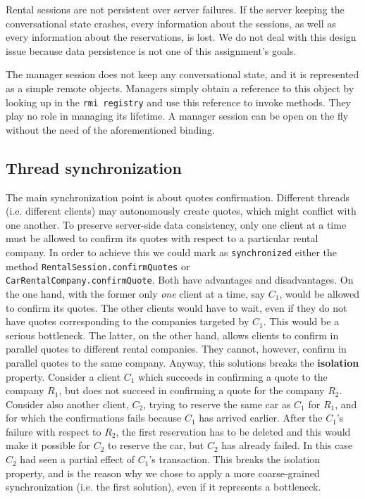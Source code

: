 Rental sessions are not persistent over server failures. If the server keeping the conversational state crashes, every information about the sessions, as well as every information about the reservations, is lost. We do not deal with this design issue because data persistence is not one of this assignment's goals. 

The manager session does not keep any conversational state, and it is represented as a simple remote objects. Managers simply obtain a reference to this object by looking up in the \texttt{rmi registry} and use this reference to invoke methods. They play no role in managing its lifetime. A manager session can be open on the fly without the need of the aforementioned binding.

\subsection{Thread synchronization}
The main synchronization point is about quotes confirmation. Different threads (i.e. different clients) may autonomously create quotes, which might conflict with one another. To preserve server-side data consistency, only one client at a time must be allowed to confirm its quotes with respect to a particular rental company. In order to achieve this we could mark as \texttt{synchronized} either the method \texttt{RentalSession.confirmQuotes} or \\\texttt{CarRentalCompany.confirmQuote}. Both have advantages and disadvantages. On the one hand, with the former only \textit{one} client at a time, say $C_1$, would be allowed to confirm its quotes. The other clients would have to wait, even if they do not have quotes corresponding to the companies targeted by $C_1$. This would be a serious bottleneck. The latter, on the other hand, allows clients to confirm in parallel quotes to different rental companies. They cannot, however, confirm in parallel quotes to the same company. Anyway, this solutions breaks the \textbf{isolation} property. Consider a client $C_1$ which succeeds in confirming a quote to the company $R_1$, but does not succeed in confirming a quote for the company $R_2$. Consider also another client, $C_2$, trying to reserve the same car as $C_1$ for $R_1$, and for which the confirmations fails because $C_1$ has arrived earlier. After the $C_1$'s failure with respect to $R_2$, the first reservation has to be deleted and this would make it possible for $C_2$ to reserve the car, but $C_2$ has already failed. In this case $C_2$ had seen a partial effect of $C_1$'s transaction. This breaks the isolation property, and is the reason why we chose to apply a more coarse-grained synchronization (i.e. the first solution), even if it represents a bottleneck.

